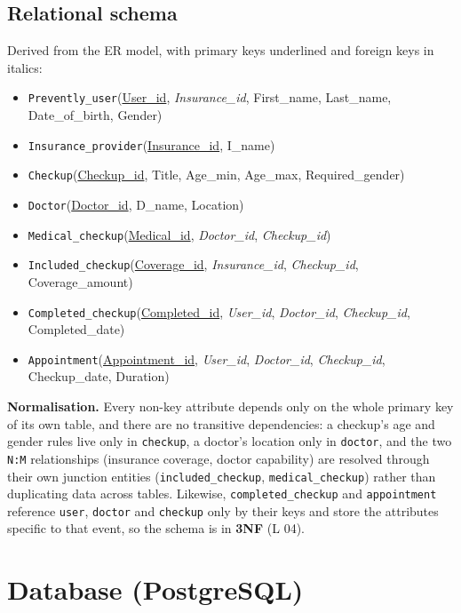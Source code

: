 \documentclass[11pt,a4paper]{article}
\begin{document}
\subsection{Relational schema}

Derived from the ER model, with primary keys underlined and foreign keys in
italics:

\begin{itemize}[leftmargin=1.4em]
  \item \texttt{Prevently\_user}(\underline{User\_id}, \emph{Insurance\_id}, First\_name, Last\_name, Date\_of\_birth, Gender)
  \item \texttt{Insurance\_provider}(\underline{Insurance\_id}, I\_name)
  \item \texttt{Checkup}(\underline{Checkup\_id}, Title, Age\_min, Age\_max, Required\_gender)
  \item \texttt{Doctor}(\underline{Doctor\_id}, D\_name, Location)
  \item \texttt{Medical\_checkup}(\underline{Medical\_id}, \emph{Doctor\_id}, \emph{Checkup\_id})
  \item \texttt{Included\_checkup}(\underline{Coverage\_id}, \emph{Insurance\_id}, \emph{Checkup\_id}, Coverage\_amount)
  \item \texttt{Completed\_checkup}(\underline{Completed\_id}, \emph{User\_id}, \emph{Doctor\_id}, \emph{Checkup\_id}, Completed\_date)
  \item \texttt{Appointment}(\underline{Appointment\_id}, \emph{User\_id}, \emph{Doctor\_id}, \emph{Checkup\_id}, Checkup\_date, Duration)
\end{itemize}

\textbf{Normalisation.} Every non-key attribute depends only on the whole
primary key of its own table, and there are no transitive dependencies: a
checkup's age and gender rules live only in \texttt{checkup}, a doctor's
location only in \texttt{doctor}, and the two \texttt{N:M} relationships
(insurance coverage, doctor capability) are resolved through their own
junction entities (\texttt{included\_checkup}, \texttt{medical\_checkup})
rather than duplicating data across tables. Likewise,
\texttt{completed\_checkup} and \texttt{appointment} reference \texttt{user},
\texttt{doctor} and \texttt{checkup} only by their keys and store the
attributes specific to that event, so the schema is in \textbf{3NF} (L 04).

\section{Database (PostgreSQL)}
\end{document}

